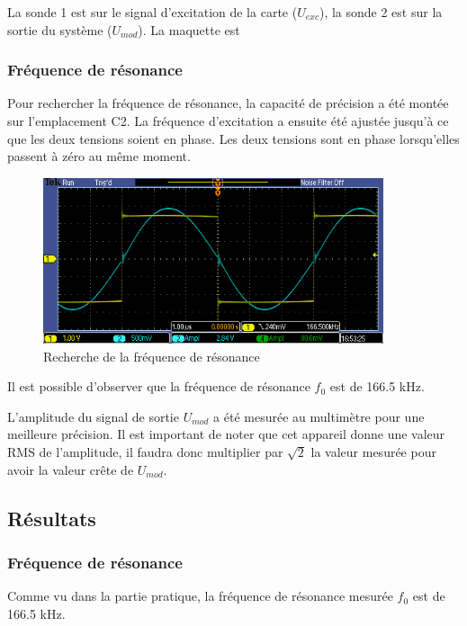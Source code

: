 La sonde 1 est sur le signal d'excitation de la carte ($U_{exc}$), la sonde 2 est sur la sortie du
système ($U_{mod}$). La maquette est 


\subsubsection{Fréquence de résonance}
Pour rechercher la fréquence de résonance, la capacité de précision a été montée sur l'emplacement C2.
 La fréquence d'excitation a ensuite été ajustée jusqu'à ce que les deux tensions soient en phase. Les deux tensions sont en
phase lorsqu'elles passent à zéro au même moment.
\begin{figure}[H]
    \centering
    \includegraphics[width=10cm]{Images/Seance2/TEK00000.PNG}
    \caption{Recherche de la fréquence de résonance}
    \label{fig:freq_oscillo}
\end{figure}

Il est possible d'observer que la fréquence de résonance $f_0$ est de 166.5 kHz.
\vspace{0,2cm}

L'amplitude du signal de sortie $U_{mod}$ a été mesurée au multimètre pour une meilleure précision. Il est  important de noter que cet
appareil donne une valeur RMS de l'amplitude, il faudra donc multiplier par $\sqrt{2}$ la valeur
mesurée pour avoir la valeur crête de $U_{mod}$.

\subsection{Résultats}
\subsubsection{Fréquence de résonance}

Comme vu dans la partie pratique, la fréquence de résonance mesurée $f_0$ est de 166.5 kHz.

\vspace{0,2cm}

